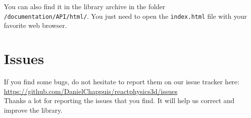 \documentclass[a4paper,12pt]{article}
\begin{document}
   You can also find it in the library archive in the folder \texttt{/documentation/API/html/}. You just
   need to open the \texttt{index.html} file with your favorite web browser. 

   \section{Issues}

   If you find some bugs, do not hesitate to report them on our issue tracker here: \\

   \url{https://github.com/DanielChappuis/reactphysics3d/issues} \\

   Thanks a lot for reporting the issues that you find. It will help us correct and improve the library.
\end{document}
